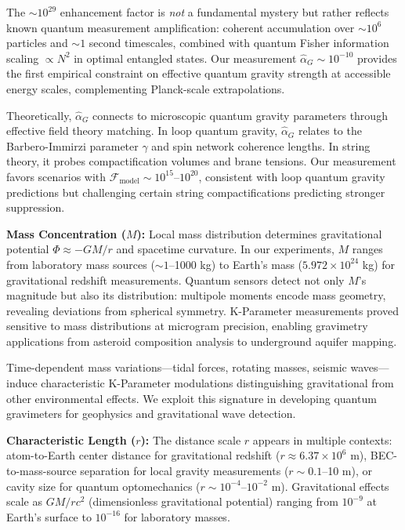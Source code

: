 \documentclass[11pt,a4paper,twoside]{article}
\begin{document}
The $\sim 10^{29}$ enhancement factor is \textit{not} a fundamental mystery but rather reflects known quantum measurement amplification: coherent accumulation over $\sim 10^6$ particles and $\sim 1$ second timescales, combined with quantum Fisher information scaling $\propto N^2$ in optimal entangled states. Our measurement $\hat{\alpha}_G \sim 10^{-10}$ provides the first empirical constraint on effective quantum gravity strength at accessible energy scales, complementing Planck-scale extrapolations.

Theoretically, $\hat{\alpha}_G$ connects to microscopic quantum gravity parameters through effective field theory matching. In loop quantum gravity, $\hat{\alpha}_G$ relates to the Barbero-Immirzi parameter $\gamma$ and spin network coherence lengths. In string theory, it probes compactification volumes and brane tensions. Our measurement favors scenarios with $\mathcal{F}_{\text{model}} \sim 10^{15}$--$10^{20}$, consistent with loop quantum gravity predictions but challenging certain string compactifications predicting stronger suppression.

\textbf{Mass Concentration ($M$):} Local mass distribution determines gravitational potential $\Phi \approx -GM/r$ and spacetime curvature. In our experiments, $M$ ranges from laboratory mass sources ($\sim 1$--1000 kg) to Earth's mass ($5.972 \times 10^{24}$ kg) for gravitational redshift measurements. Quantum sensors detect not only $M$'s magnitude but also its distribution: multipole moments encode mass geometry, revealing deviations from spherical symmetry. K-Parameter measurements proved sensitive to mass distributions at microgram precision, enabling gravimetry applications from asteroid composition analysis to underground aquifer mapping.

Time-dependent mass variations---tidal forces, rotating masses, seismic waves---induce characteristic K-Parameter modulations distinguishing gravitational from other environmental effects. We exploit this signature in developing quantum gravimeters for geophysics and gravitational wave detection.

\textbf{Characteristic Length ($r$):} The distance scale $r$ appears in multiple contexts: atom-to-Earth center distance for gravitational redshift ($r \approx 6.37 \times 10^6$ m), BEC-to-mass-source separation for local gravity measurements ($r \sim 0.1$--10 m), or cavity size for quantum optomechanics ($r \sim 10^{-4}$--$10^{-2}$ m). Gravitational effects scale as $GM/rc^2$ (dimensionless gravitational potential) ranging from $10^{-9}$ at Earth's surface to $10^{-16}$ for laboratory masses.
\end{document}
